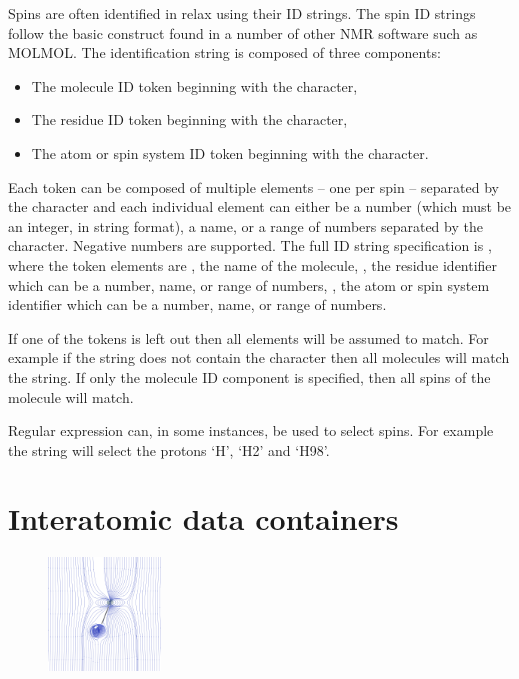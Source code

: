 Spins are often identified in relax using their ID strings.  The spin ID strings follow the basic construct found in a number of other NMR software such as MOLMOL.  The identification string is composed of three components:

\begin{itemize}
\item The molecule ID token beginning with the \promptstring{\#} character,
\item The residue ID token beginning with the \promptstring{:} character,
\item The atom or spin system ID token beginning with the  character.
\end{itemize}

Each token can be composed of multiple elements -- one per spin -- separated by the \promptstring{,} character and each individual element can either be a number (which must be an integer, in string format), a name, or a range of numbers separated by the \promptstring{-} character.  Negative numbers are supported.  The full ID string specification is , where the token elements are , the name of the molecule, , the residue identifier which can be a number, name, or range of numbers, , the atom or spin system identifier which can be a number, name, or range of numbers.

If one of the tokens is left out then all elements will be assumed to match.  For example if the string does not contain the \promptstring{\#} character then all molecules will match the string.  If only the molecule ID component is specified, then all spins of the molecule will match.

Regular expression can, in some instances, be used to select spins.  For example the string  will select the protons `H', `H2' and `H98'.




\section{Interatomic data containers} \label{sect: interatomic container}

\begin{figure}[h]
\includegraphics[width=3cm, bb=0 0 1701 1701]{graphics/wizards/dipole_pair/NH_dipole_pair_600x600}
\end{figure}

